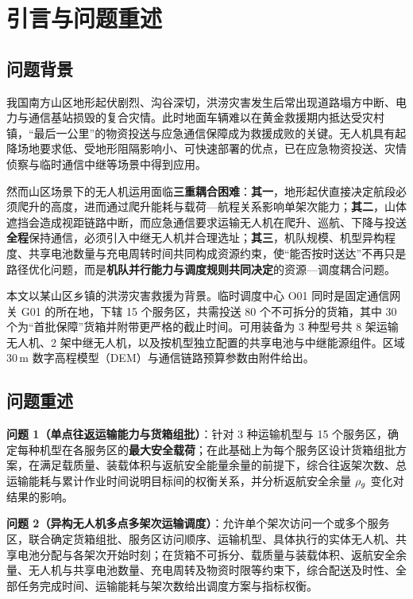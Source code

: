 \section{引言与问题重述}
\subsection{问题背景}

我国南方山区地形起伏剧烈、沟谷深切，洪涝灾害发生后常出现道路塌方中断、电力与通信基站损毁的复合灾情。此时地面车辆难以在黄金救援期内抵达受灾村镇，“最后一公里”的物资投送与应急通信保障成为救援成败的关键。无人机具有起降场地要求低、受地形阻隔影响小、可快速部署的优点，已在应急物资投送、灾情侦察与临时通信中继等场景中得到应用\cite{yang2026dronehumanitarian,zhang2021truckdrone,wang2014reliefrouting}。

然而山区场景下的无人机运用面临\textbf{三重耦合困难}：\textbf{其一}，地形起伏直接决定航段必须爬升的高度，进而通过爬升能耗与载荷—航程关系影响单架次能力；\textbf{其二}，山体遮挡会造成视距链路中断，而应急通信要求运输无人机在爬升、巡航、下降与投送\textbf{全程}保持通信，必须引入中继无人机并合理选址；\textbf{其三}，机队规模、机型异构程度、共享电池数量与充电周转时间共同构成资源约束，使“能否按时送达”不再只是路径优化问题，而是\textbf{机队并行能力与调度规则共同决定}的资源—调度耦合问题。

本文以某山区乡镇的洪涝灾害救援为背景。临时调度中心 O01 同时是固定通信网关 G01 的所在地，下辖 15 个服务区，共需投送 80 个不可拆分的货箱，其中 30 个为“首批保障”货箱并附带更严格的截止时间。可用装备为 3 种型号共 8 架运输无人机、2 架中继无人机，以及按机型独立配置的共享电池与中继能源组件。区域 30\,m 数字高程模型（DEM）与通信链路预算参数由附件给出。

\subsection{问题重述}

\noindent \textbf{问题 1（单点往返运输能力与货箱组批）}：针对 3 种运输机型与 15 个服务区，确定每种机型在各服务区的\textbf{最大安全载荷}；在此基础上为每个服务区设计货箱组批方案，在满足载质量、装载体积与返航安全能量余量的前提下，综合往返架次数、总运输能耗与累计作业时间说明目标间的权衡关系，并分析返航安全余量 $\rho_{g}$ 变化对结果的影响。

\noindent \textbf{问题 2（异构无人机多点多架次运输调度）}：允许单个架次访问一个或多个服务区，联合确定货箱组批、服务区访问顺序、运输机型、具体执行的实体无人机、共享电池分配与各架次开始时刻；在货箱不可拆分、载质量与装载体积、返航安全余量、无人机与共享电池数量、充电周转及物资时限等约束下，综合配送及时性、全部任务完成时间、运输能耗与架次数给出调度方案与指标权衡。


